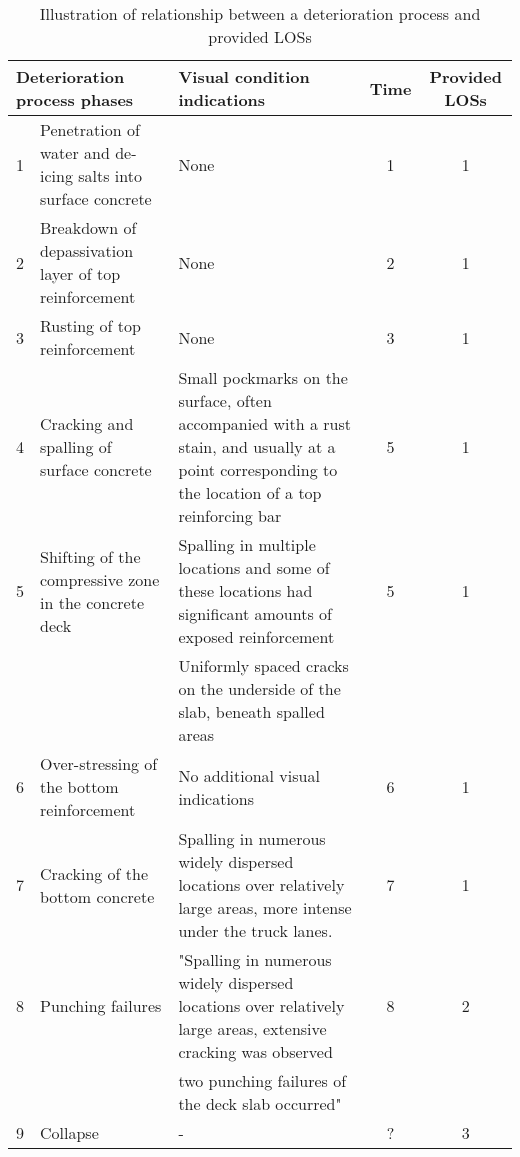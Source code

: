 \begin{table}
\caption{Illustration of relationship between a deterioration process and provided LOSs}
\begin{tabular}{|l|p{110pt}|p{190pt}|l|l|}
\hline
\multicolumn{2}{|l|}{Deterioration process phases} & Visual condition indications & \multicolumn{1}{c|}{\hspace{2mm}Time \hspace{2mm}} & \multicolumn{1}{c|}{Provided LOSs} \\ 
\hline
\multicolumn{1}{|c|}{\hspace{2mm}  1 \hspace{2mm} } & Penetration of water and de-icing salts into surface concrete & None & \multicolumn{1}{c|}{1} & \multicolumn{1}{c|}{1} \\ 
\hline
\multicolumn{1}{|c|}{2} & Breakdown of depassivation layer of top reinforcement & None & \multicolumn{1}{c|}{2} & \multicolumn{1}{c|}{1} \\ 
\hline
\multicolumn{1}{|c|}{3} & Rusting of top reinforcement & None & \multicolumn{1}{c|}{3} & \multicolumn{1}{c|}{1} \\ 
\hline
\multicolumn{1}{|c|}{4} & Cracking and spalling of surface concrete & Small pockmarks on the surface, often accompanied with a rust stain, and usually at a point corresponding to the location of a top reinforcing bar & \multicolumn{1}{c|}{5} & \multicolumn{1}{c|}{1} \\ 
\hline
\multicolumn{1}{|c|}{5} & Shifting of the compressive zone in the concrete deck & Spalling in multiple locations and some of these locations had significant amounts of exposed reinforcement & \multicolumn{1}{c|}{5} & \multicolumn{1}{c|}{1} \\ 
\multicolumn{1}{|c|}{} &  & Uniformly spaced cracks on the underside of the slab, beneath spalled areas & \multicolumn{1}{c|}{} & \multicolumn{1}{c|}{} \\ 
\hline
\multicolumn{1}{|c|}{6} & Over-stressing of the bottom reinforcement & No additional visual indications & \multicolumn{1}{c|}{6} & \multicolumn{1}{c|}{1} \\ 
\hline
\multicolumn{1}{|c|}{7} & Cracking of the bottom concrete & Spalling in numerous widely dispersed locations over relatively large areas, more intense under the truck lanes. & \multicolumn{1}{c|}{7} & \multicolumn{1}{c|}{1} \\ 
\hline
\multicolumn{1}{|c|}{8} & Punching failures & "Spalling in numerous widely dispersed locations over relatively large areas, extensive cracking was observed & \multicolumn{1}{c|}{8} & \multicolumn{1}{c|}{2} \\ 
\multicolumn{1}{|c|}{} &  & two punching failures of the deck slab occurred" & \multicolumn{1}{c|}{} & \multicolumn{1}{c|}{} \\ 
\hline
\multicolumn{1}{|c|}{9} & Collapse & - & \multicolumn{1}{c|}{?} & \multicolumn{1}{c|}{3} \\ 
\hline
\end{tabular}
\label{tbl:211}
\end{table}

